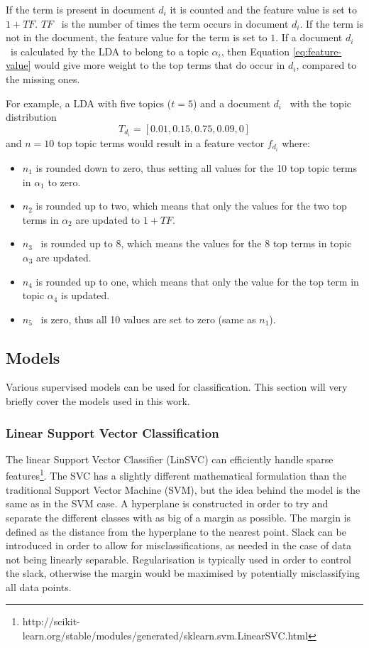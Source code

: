 If the term is present in document $d_i$ it is counted and the feature value is set to $1+TF$.
$TF$  is the number of times the term occurs in document $d_i$.  
If the term is not in the document, the feature value for the term is set to $1$.
If a document $d_i$  is calculated by the LDA to belong to a topic $\alpha_i$, then Equation \ref{eq:feature-value} would give more weight to the top terms that do occur in $d_i$, compared to the missing ones.

For example, a LDA with five topics ($t=5$) and a document $d_i$  with the topic distribution 
\[T_{d_i}=[0.01, 0.15, 0.75, 0.09, 0]\]
and $n=10$ top topic terms would result in a feature vector $f_{d_i}$ where:

\begin{itemize}
    \item $n_1$ is rounded down to zero, thus setting all values for the 10 top topic terms in $\alpha_1$ to zero.
    \item $n_2$ is rounded up to two, which means that only the values for the two top terms in $\alpha_2$ are updated to $1+TF$.
    \item $n_3$  is rounded up to 8, which means the values for the 8 top terms in topic $\alpha_3$ are updated.
    \item $n_4$ is rounded up to one, which means that only the value for the top term in topic $\alpha_4$ is updated.
    \item $n_5$  is zero, thus all 10 values are set to zero (same as $n_1$).
\end{itemize}

\subsection{Models} \label{sec:theory-models}

Various supervised models can be used for classification.
This section will very briefly cover the models used in this work.

\subsubsection{Linear Support Vector Classification}
The linear Support Vector Classifier (LinSVC) can efficiently handle sparse features\footnote{http://scikit-learn.org/stable/modules/generated/sklearn.svm.LinearSVC.html}.
The SVC has a slightly different mathematical formulation than the traditional Support Vector Machine (SVM), but the idea behind the model is the same as in the SVM case.
A hyperplane is constructed in order to try and separate the different classes with as big of a margin as possible.
The margin is defined as the distance from the hyperplane to the nearest point.
Slack can be introduced in order to allow for misclassifications, as needed in the case of data not being linearly separable.
Regularisation is typically used in order to control the slack, otherwise the margin would be maximised by potentially misclassifying all data points.

